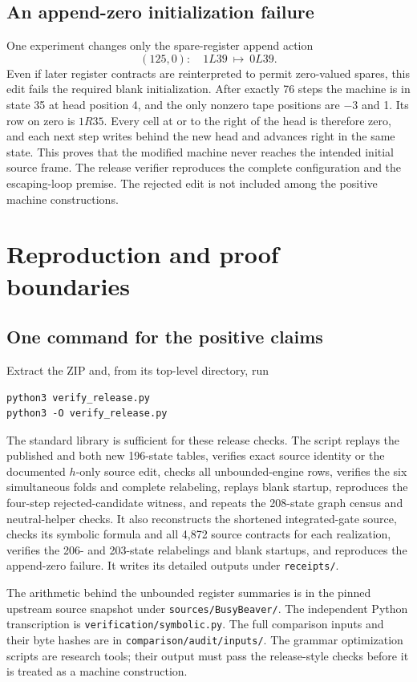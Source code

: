 \documentclass[11pt,letterpaper]{article}
\begin{document}
\subsection{An append-zero initialization failure}
One experiment changes only the spare-register append action
\[
 (125,0):\quad 1L39\ \longmapsto\ 0L39.
\]
Even if later register contracts are reinterpreted to permit zero-valued
spares, this edit fails the required blank initialization. After exactly
76 steps the machine is in state 35 at head position 4, and the only
nonzero tape positions are $-3$ and 1. Its row on zero is $1R35$.
Every cell at or to the right of the head is therefore zero, and each next
step writes behind the new head and advances right in the same state.
This proves that the modified machine never reaches the intended initial
source frame. The release verifier reproduces the complete configuration
and the escaping-loop premise. The rejected edit is not included among
the positive machine constructions.

\section{Reproduction and proof boundaries}
\label{sec:reproduction}
\subsection{One command for the positive claims}
Extract the ZIP and, from its top-level directory, run
\begin{lstlisting}
python3 verify_release.py
python3 -O verify_release.py
\end{lstlisting}
The standard library is sufficient for these release checks. The script
replays the published and both new 196-state tables, verifies exact source
identity or the documented $h$-only source edit, checks all unbounded-engine
rows, verifies the six simultaneous folds and complete relabeling, replays
blank startup, reproduces the four-step rejected-candidate witness, and
repeats the 208-state graph census and neutral-helper checks.
It also reconstructs the shortened integrated-gate source, checks its
symbolic formula and all 4,872 source contracts for each realization,
verifies the 206- and 203-state relabelings and blank startups, and reproduces
the append-zero failure.
It writes its detailed outputs under \texttt{receipts/}.

The arithmetic behind the unbounded register summaries is in the pinned
upstream source snapshot under \texttt{sources/BusyBeaver/}. The independent
Python transcription is \texttt{verification/symbolic.py}. The full
comparison inputs and their byte hashes are in
\texttt{comparison/audit/inputs/}. The grammar optimization scripts are
research tools; their output must pass the release-style checks before it
is treated as a machine construction.
\end{document}
